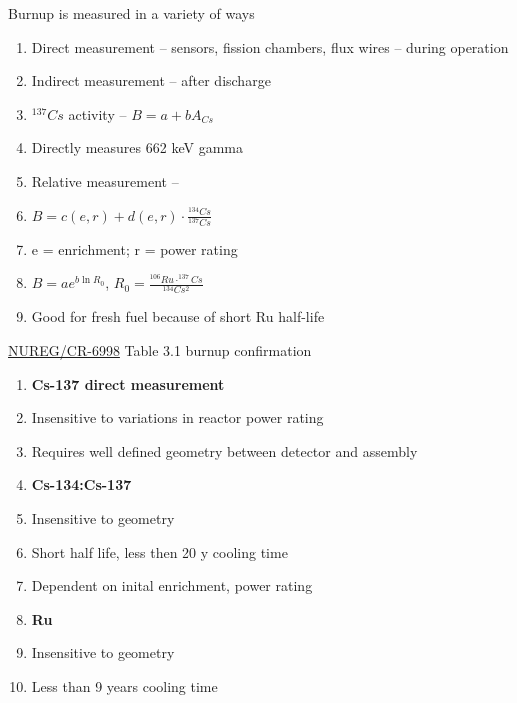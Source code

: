 \documentclass[aspectratio=1610,pdftex,dvipsnames,compress,xcolor={dvipsnames}]{beamer}
\begin{document}
\begin{frame}{Burnup is measured in a variety of ways}
    \begin{enumerate}[series=outerlist,topsep=0pt,itemsep=5pt,leftmargin=*,label=(\arabic*)]
        \item[]Direct measurement -- sensors, fission chambers, flux wires -- during operation
        \item[]Indirect measurement -- after discharge
            \vspace{0.10in}
        \item[]$^{137}Cs$ activity -- $B=a+bA_{Cs}$
        \item[]Directly measures 662 keV gamma
            \vspace{0.10in}
        \item[]Relative measurement --
        \item[]$B=c(e,r)+d(e,r) \cdot \frac{^{134}Cs}{^{137}Cs}$
        \item[]e = enrichment; r = power rating
            \vspace{0.10in}
        \item[]$B=ae^{b\ln{R_0}}$, $R_0=\frac{^{106}Ru\cdot ^{137}Cs}{^{134}Cs^2}$
        \item[]Good for fresh fuel because of short Ru half-life
    \end{enumerate}
\end{frame}


\begin{frame}{\href{https://www.nrc.gov/docs/ML1002/ML100210543.pdf}{NUREG/CR-6998} Table 3.1 burnup confirmation}
    \begin{enumerate}[series=outerlist,topsep=0pt,itemsep=5pt,leftmargin=*,label=(\arabic*)]
        \item[]\textbf{Cs-137 direct measurement}
        \item[]Insensitive to variations in reactor power rating 
        \item[]Requires well defined geometry between detector and assembly
            \vspace{0.10in}
        \item[]\textbf{Cs-134:Cs-137}
        \item[]Insensitive to geometry
        \item[]Short half life, less then 20 y cooling time
        \item[]Dependent on inital enrichment, power rating
            \vspace{0.10in}
        \item[]\textbf{Ru}
        \item[]Insensitive to geometry
        \item[]Less than 9 years cooling time
    \end{enumerate}
\end{frame}
\end{document}
